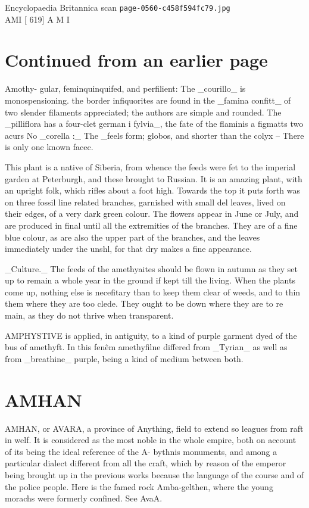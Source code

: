 \documentclass{article}
\begin{document}
\begin{center}
{\Large Encyclopaedia Britannica scan \texttt{page-0560-c458f594fc79.jpg}}\\[0.5em]
AMI [ 619] A M I
\end{center}
\section*{Continued from an earlier page}
Amothy- gular, feminquinquifed, and perfilient: The \_courillo\_ is monospensioning. the border infiquorites are found in the \_famina confitt\_ of two slender filaments appreciated; the authors are simple and rounded. The \_pilliflora has a four-clet german i fylvia\_, the fate of the flaminis a figmatts two acurs No \_corella :\_ The \_feels form; globos, and shorter than the colyx – There is only one known facec.

This plant is a native of Siberia, from whence the feeds were fet to the imperial garden at Peterburgh, and these brought to Russian. It is an amazing plant, with an upright folk, which rifles about a foot high. Towards the top it puts forth was on three fossil line related branches, garnished with small del leaves, lived on their edges, of a very dark green colour. The flowers appear in June or July, and are produced in final until all the extremities of the branches. They are of a fine blue colour, as are also the upper part of the branches, and the leaves immediately under the unshl, for that dry makes a fine appearance.

\_Culture.\_ The feeds of the amethyaites should be flown in autumn as they set up to remain a whole year in the ground if kept till the living. When the plants come up, nothing else is necefitary than to keep them clear of weeds, and to thin them where they are too clede. They ought to be down where they are to re main, as they do not thrive when transparent.

AMPHYSTIVE is applied, in antiguity, to a kind of purple garment dyed of the bus of amethyft. In this fenêm amethyfilne differed from \_Tyrian\_ as well as from \_breathine\_ purple, being a kind of medium between both.

\section*{AMHAN}
AMHAN, or AVARA, a province of Anything, field to extend so leagues from raft in welf. It is considered as the most noble in the whole empire, both on account of its being the ideal reference of the A- bythnis monuments, and among a particular dialect different from all the craft, which by reason of the emperor being brought up in the previous works because the language of the course and of the police people. Here is the famed rock Amba-gelthen, where the young morachs were formerly confined. See AvaA.
\end{document}
